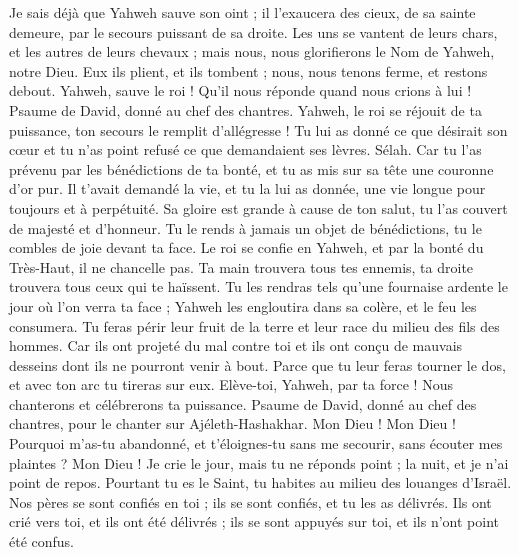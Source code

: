 \begin{multicols}{2}
Je sais déjà que Yahweh sauve son oint ; il l'exaucera des cieux, de sa sainte demeure, par le secours puissant de sa droite.
Les uns se vantent de leurs chars, et les autres de leurs chevaux ; mais nous, nous glorifierons le Nom de Yahweh, notre Dieu.
Eux ils plient, et ils tombent ; nous, nous tenons ferme, et restons debout.
Yahweh, sauve le roi ! Qu'il nous réponde quand nous crions à lui !
\VerseOne{}Psaume de David, donné au chef des chantres.
Yahweh, le roi se réjouit de ta puissance, ton secours le remplit d'allégresse !
Tu lui as donné ce que désirait son cœur et tu n'as point refusé ce que demandaient ses lèvres. Sélah.
Car tu l'as prévenu par les bénédictions de ta bonté, et tu as mis sur sa tête une couronne d'or pur.
Il t'avait demandé la vie, et tu la lui as donnée, une vie longue pour toujours et à perpétuité.
Sa gloire est grande à cause de ton salut, tu l'as couvert de majesté et d'honneur.
Tu le rends à jamais un objet de bénédictions, tu le combles de joie devant ta face.
Le roi se confie en Yahweh, et par la bonté du Très-Haut, il ne chancelle pas.
Ta main trouvera tous tes ennemis, ta droite trouvera tous ceux qui te haïssent.
Tu les rendras tels qu'une fournaise ardente le jour où l'on verra ta face ; Yahweh les engloutira dans sa colère, et le feu les consumera.
Tu feras périr leur fruit de la terre et leur race du milieu des fils des hommes.
Car ils ont projeté du mal contre toi et ils ont conçu de mauvais desseins dont ils ne pourront venir à bout.
Parce que tu leur feras tourner le dos, et avec ton arc tu tireras sur eux.
Elève-toi, Yahweh, par ta force ! Nous chanterons et célébrerons ta puissance.
\VerseOne{}Psaume de David, donné au chef des chantres, pour le chanter sur Ajéleth-Hashakhar.
Mon Dieu ! Mon Dieu ! Pourquoi m'as-tu abandonné, et t'éloignes-tu sans me secourir, sans écouter mes plaintes ?
Mon Dieu ! Je crie le jour, mais tu ne réponds point ; la nuit, et je n'ai point de repos.
Pourtant tu es le Saint, tu habites au milieu des louanges d'Israël.
Nos pères se sont confiés en toi ; ils se sont confiés, et tu les as délivrés.
Ils ont crié vers toi, et ils ont été délivrés ; ils se sont appuyés sur toi, et ils n'ont point été confus.

\end{multicols}
